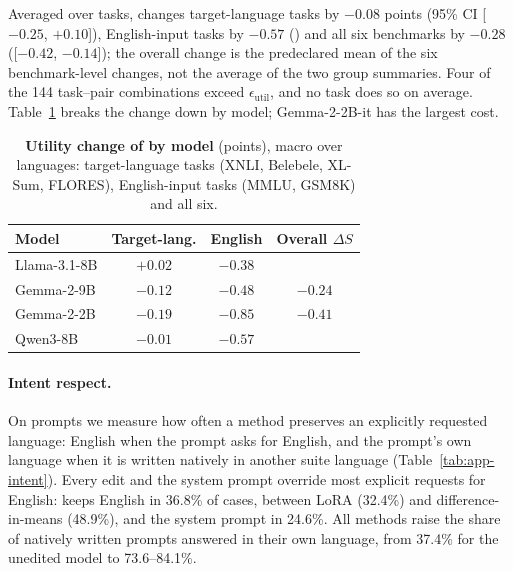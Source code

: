 Averaged over tasks, \foxp changes target-language tasks by $-0.08$ points (95\% CI [$-0.25$, $+0.10$]), English-input tasks by $-0.57$ () and all six benchmarks by $-0.28$ ([$-0.42$, $-0.14$]); the overall change is the predeclared mean of the six benchmark-level changes, not the average of the two group summaries.
 Four of the 144 task--pair combinations exceed $\epsilon_{\mathrm{util}}$, and no task does so on average. Table~\ref{tab:app-utility-model} breaks the change down by model; Gemma-2-2B-it has the largest cost.

\begin{table}[!htbp]
  \centering
  \footnotesize
  \setlength{\tabcolsep}{4pt}
  \begin{tabular}{@{}lccc@{}}
    \toprule
    \textbf{Model} & \textbf{Target-lang.} & \textbf{English} & \textbf{Overall $\Delta S$} \\
    \midrule
    Llama-3.1-8B & $+0.02$ & $-0.38$ & \res{?} \\
    Gemma-2-9B & $-0.12$ & $-0.48$ & $-0.24$ \\
    Gemma-2-2B & $-0.19$ & $-0.85$ & $-0.41$ \\
    Qwen3-8B & $-0.01$ & $-0.57$ & \res{?} \\
    \bottomrule
  \end{tabular}
  \caption{\textbf{Utility change of \foxp by model} (points), macro over languages: target-language tasks (XNLI, Belebele, XL-Sum, FLORES), English-input tasks (MMLU, GSM8K) and all six.}
  \label{tab:app-utility-model}
\end{table}

\paragraph{Intent respect.}
On \intent prompts we measure how often a method preserves an explicitly requested language: English when the prompt asks for English, and the prompt's own language when it is written natively in another suite language (Table~\ref{tab:app-intent}). Every edit and the system prompt override most explicit requests for English: \foxp keeps English in 36.8\% of cases, between LoRA (32.4\%) and difference-in-means (48.9\%), and the system prompt in 24.6\%. All methods raise the share of natively written prompts answered in their own language, from 37.4\% for the unedited model to 73.6--84.1\%.

